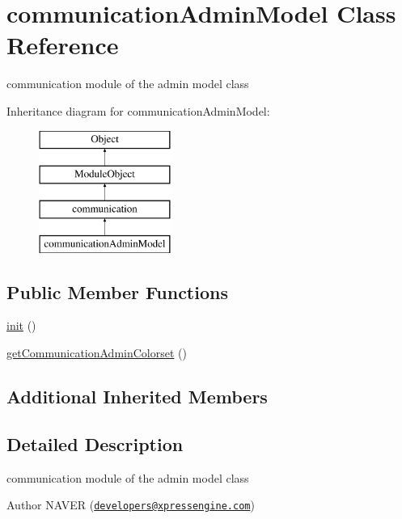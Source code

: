 \hypertarget{classcommunicationAdminModel}{}\section{communication\+Admin\+Model Class Reference}
\label{classcommunicationAdminModel}


communication module of the admin model class  


Inheritance diagram for communication\+Admin\+Model\+:\begin{figure}[H]
\begin{center}
\leavevmode
\includegraphics[height=4.000000cm]{classcommunicationAdminModel}
\end{center}
\end{figure}
\subsection*{Public Member Functions}
\begin{DoxyCompactItemize}
\item 
\hyperlink{classcommunicationAdminModel_a4e1331e1b2ae7131c7466d3eaf1f86f0}{init} ()
\item 
\hyperlink{classcommunicationAdminModel_ade2f9d20f5902304d38999095261c827}{get\+Communication\+Admin\+Colorset} ()
\end{DoxyCompactItemize}
\subsection*{Additional Inherited Members}


\subsection{Detailed Description}
communication module of the admin model class 

\begin{DoxyAuthor}{Author}
N\+A\+V\+ER (\href{mailto:developers@xpressengine.com}{\tt developers@xpressengine.\+com}) 
\end{DoxyAuthor}


